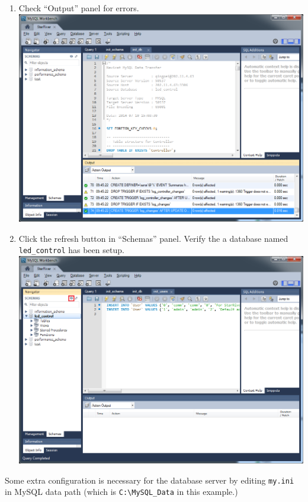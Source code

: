 \begin{enumerate}
\item
  Check ``Output'' panel for errors.
  \includegraphics{img/db_init_10.png}
\item
  Click the refresh button in ``Schemas'' panel. Verify the a database
  named \texttt{led\_control} has been setup.
  \includegraphics{img/db_init_12.png}
\end{enumerate}

Some extra configuration is necessary for the database server by editing
\texttt{my.ini} in MySQL data path (which is
\texttt{C:\textbackslash{}MySQL\_Data} in this example.)


